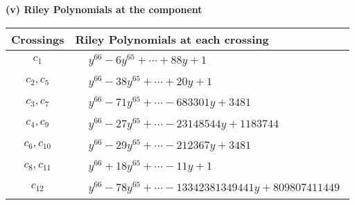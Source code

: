 \documentclass[1p]{elsarticle_modified}
\theoremstyle{definition}
\begin{document}
\flushleft \textbf{(v) Riley Polynomials at the component}\newline \\
\begin{tabular}{m{50pt}|m{274pt}}
Crossings & \hspace{64pt}Riley Polynomials at each crossing \\
\hline $$\begin{aligned}c_{1}\end{aligned}$$&$\begin{aligned}
&y^{66}-6 y^{65}+\cdots+88 y+1
\end{aligned}$\\
\hline $$\begin{aligned}c_{2},c_{5}\end{aligned}$$&$\begin{aligned}
&y^{66}-38 y^{65}+\cdots+20 y+1
\end{aligned}$\\
\hline $$\begin{aligned}c_{3},c_{7}\end{aligned}$$&$\begin{aligned}
&y^{66}-71 y^{65}+\cdots-683301 y+3481
\end{aligned}$\\
\hline $$\begin{aligned}c_{4},c_{9}\end{aligned}$$&$\begin{aligned}
&y^{66}-27 y^{65}+\cdots-23148544 y+1183744
\end{aligned}$\\
\hline $$\begin{aligned}c_{6},c_{10}\end{aligned}$$&$\begin{aligned}
&y^{66}-29 y^{65}+\cdots-212367 y+3481
\end{aligned}$\\
\hline $$\begin{aligned}c_{8},c_{11}\end{aligned}$$&$\begin{aligned}
&y^{66}+18 y^{65}+\cdots-11 y+1
\end{aligned}$\\
\hline $$\begin{aligned}c_{12}\end{aligned}$$&$\begin{aligned}
&y^{66}-78 y^{65}+\cdots-13342381349441 y+809807411449
\end{aligned}$\\
\hline
\end{tabular}\\~\\
\end{document}
